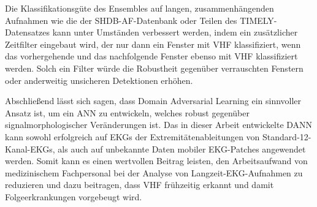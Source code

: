 Die Klassifikationsgüte des Ensembles auf langen, zusammenhängenden Aufnahmen wie die der \gls{SHDB-AF}-Datenbank oder Teilen des TIMELY-Datensatzes kann unter Umständen verbessert werden, indem ein zusätzlicher Zeitfilter eingebaut wird, der nur dann ein Fenster mit \gls{VHF} klassifiziert, wenn das vorhergehende und das nachfolgende Fenster ebenso mit \gls{VHF} klassifiziert werden. Solch ein Filter würde die Robustheit gegenüber verrauschten Fenstern oder anderweitig unsicheren Detektionen erhöhen.

Abschließend lässt sich sagen, dass Domain Adversarial Learning ein sinnvoller Ansatz ist, um ein \gls{ANN} zu entwickeln, welches robust gegenüber signalmorphologischer Veränderungen ist. Das in dieser Arbeit entwickelte \gls{DANN} kann sowohl erfolgreich auf \gls{EKG}s der Extremitätenableitungen von Standard-12-Kanal-\gls{EKG}s, als auch auf unbekannte Daten mobiler \gls{EKG}-Patches angewendet werden. Somit kann es einen wertvollen Beitrag leisten, den Arbeitsaufwand von medizinischem Fachpersonal bei der Analyse von Langzeit-\gls{EKG}-Aufnahmen zu reduzieren und dazu beitragen, dass \gls{VHF} frühzeitig erkannt und damit Folgeerkrankungen vorgebeugt wird.